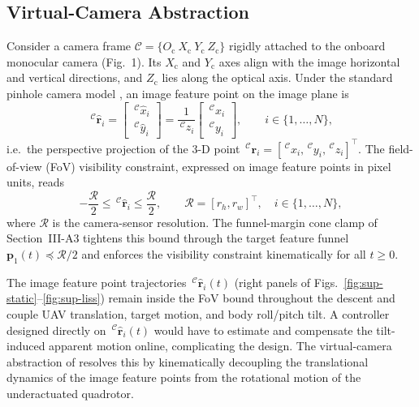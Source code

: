 \documentclass[10pt,journal]{IEEEtran}
\begin{document}
\subsection{Virtual-Camera Abstraction}
\label{sup:virtual_features}
Consider a camera frame $\mathcal{C}=\{O_{\text{c}}~X_{\text{c}}~Y_{\text{c}}~Z_{\text{c}}\}$ rigidly attached to the onboard monocular camera (Fig.~1). Its $X_{\text{c}}$ and $Y_{\text{c}}$ axes align with the image horizontal and vertical directions, and $Z_{\text{c}}$ lies along the optical axis. Under the standard pinhole camera model \cite{chaumette2006}, an image feature point on the image plane is
\begin{equation}
\label{sup:pinhole camera model}
    \,^\mathcal{C}\hat{\boldsymbol{r}}_i = \begin{bmatrix} \,^\mathcal{C}\hat{x}_i \\ \,^\mathcal{C}\hat{y}_i \end{bmatrix}
    = \frac{1}{\,^\mathcal{C}z_i}\begin{bmatrix} \,^\mathcal{C}x_i \\ \,^\mathcal{C}y_i \end{bmatrix},\qquad i\in\{1,\ldots,N\},
\end{equation}
i.e.\ the perspective projection of the 3-D point $\,^\mathcal{C}\boldsymbol{r}_i=[\,^\mathcal{C}x_i,\,^\mathcal{C}y_i,\,^\mathcal{C}z_i]^{\top}$. The field-of-view (FoV) visibility constraint, expressed on image feature points in pixel units, reads
\begin{equation} \label{sup:visibility_constraints}
    -\frac{\mathcal{R}}{2} \le \,^\mathcal{C}\hat{\boldsymbol{r}}_i \le \frac{\mathcal{R}}{2},\qquad \mathcal{R}=[r_h,r_w]^\top,\quad i\in\{1,\ldots,N\},
\end{equation}
where $\mathcal{R}$ is the camera-sensor resolution. The funnel-margin cone clamp of Section~III-A3 tightens this bound through the target feature funnel $\boldsymbol{p}_1(t)\preceq\mathcal{R}/2$ and enforces the visibility constraint kinematically for all $t\ge 0$.

The image feature point trajectories $\,^\mathcal{C}\hat{\boldsymbol{r}}_i(t)$ (right panels of Figs.~\ref{fig:sup-static}--\ref{fig:sup-liss}) remain inside the FoV bound throughout the descent and couple UAV translation, target motion, and body roll/pitch tilt. A controller designed directly on $\,^\mathcal{C}\hat{\boldsymbol{r}}_i(t)$ would have to estimate and compensate the tilt-induced apparent motion online, complicating the design. The virtual-camera abstraction of \cite{fink2017, xie2016_2} resolves this by kinematically decoupling the translational dynamics of the image feature points from the rotational motion of the underactuated quadrotor.
\end{document}
